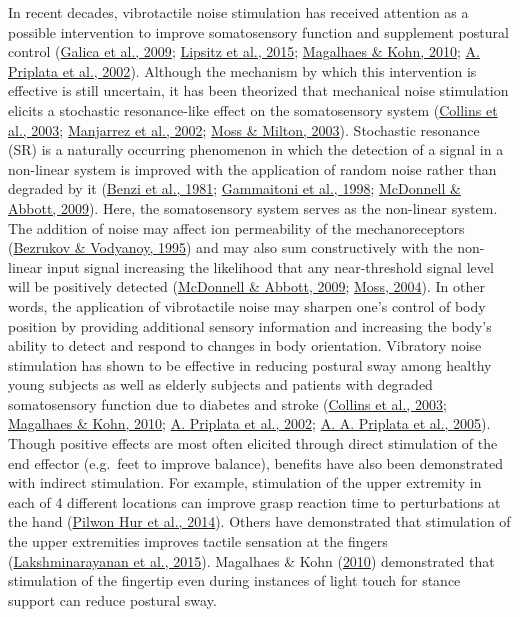 \documentclass[]{cik}%
\begin{document}
In recent decades, vibrotactile noise stimulation has received attention
as a possible intervention to improve somatosensory function and
supplement postural control (\protect\hyperlink{ref-Galica2009}{Galica
et al., 2009}; \protect\hyperlink{ref-Lipsitz2015}{Lipsitz et al.,
2015}; \protect\hyperlink{ref-magalhuxe3es2011}{Magalhaes \& Kohn,
2010}; \protect\hyperlink{ref-Priplata2002}{A. Priplata et al., 2002}).
Although the mechanism by which this intervention is effective is still
uncertain, it has been theorized that mechanical noise stimulation
elicits a stochastic resonance-like effect on the somatosensory system
(\protect\hyperlink{ref-Collins2003}{Collins et al., 2003};
\protect\hyperlink{ref-Manjarrez2002}{Manjarrez et al., 2002};
\protect\hyperlink{ref-Moss2003}{Moss \& Milton, 2003}). Stochastic
resonance (SR) is a naturally occurring phenomenon in which the
detection of a signal in a non-linear system is improved with the
application of random noise rather than degraded by it
(\protect\hyperlink{ref-benzi1981}{Benzi et al., 1981};
\protect\hyperlink{ref-gammaitoni1998}{Gammaitoni et al., 1998};
\protect\hyperlink{ref-McDonnell2009}{McDonnell \& Abbott, 2009}). Here,
the somatosensory system serves as the non-linear system. The addition
of noise may affect ion permeability of the mechanoreceptors
(\protect\hyperlink{ref-Bezrukov1995}{Bezrukov \& Vodyanoy, 1995}) and
may also sum constructively with the non-linear input signal increasing
the likelihood that any near-threshold signal level will be positively
detected (\protect\hyperlink{ref-McDonnell2009}{McDonnell \& Abbott,
2009}; \protect\hyperlink{ref-Moss2004}{Moss, 2004}). In other words,
the application of vibrotactile noise may sharpen one's control of body
position by providing additional sensory information and increasing the
body's ability to detect and respond to changes in body orientation.
Vibratory noise stimulation has shown to be effective in reducing
postural sway among healthy young subjects as well as elderly subjects
and patients with degraded somatosensory function due to diabetes and
stroke (\protect\hyperlink{ref-Collins2003}{Collins et al., 2003};
\protect\hyperlink{ref-magalhuxe3es2011}{Magalhaes \& Kohn, 2010};
\protect\hyperlink{ref-Priplata2002}{A. Priplata et al., 2002};
\protect\hyperlink{ref-Priplata2006}{A. A. Priplata et al., 2005}).
Though positive effects are most often elicited through direct
stimulation of the end effector (e.g.~feet to improve balance), benefits
have also been demonstrated with indirect stimulation. For example,
stimulation of the upper extremity in each of 4 different locations can
improve grasp reaction time to perturbations at the hand
(\protect\hyperlink{ref-Hur2014}{Pilwon Hur et al., 2014}). Others have
demonstrated that stimulation of the upper extremities improves tactile
sensation at the fingers
(\protect\hyperlink{ref-Lakshminarayanan2015}{Lakshminarayanan et al.,
2015}). Magalhaes \& Kohn
(\protect\hyperlink{ref-magalhuxe3es2011}{2010}) demonstrated that
stimulation of the fingertip even during instances of light touch for
stance support can reduce postural sway.
\end{document}
